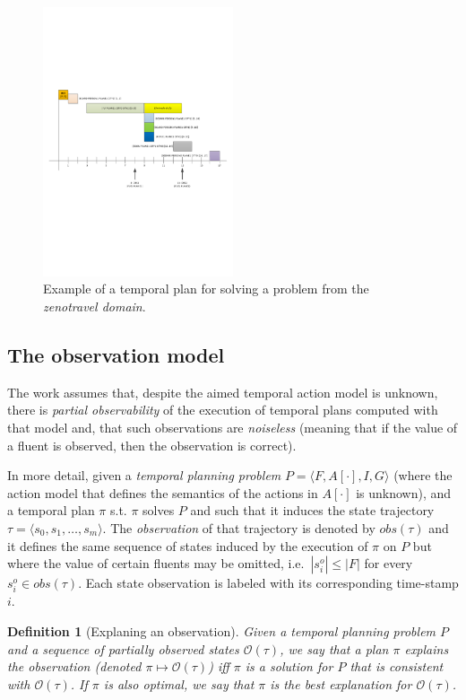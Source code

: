 \documentclass[letterpaper]{article} %
\newcommand{\tup}[1]{{\langle #1 \rangle}}
\newtheorem{definition}[theorem]{Definition}
\begin{document}
\begin{figure}
        \includegraphics[width=0.5\textwidth]{plan}
	\caption{Example of a temporal plan for solving a problem from the {\em zenotravel domain}.}
	\label{fig:plan}
\end{figure}


\subsection{The observation model}
The work assumes that, despite the aimed temporal action model is unknown, there is {\em partial observability} of the execution of temporal plans computed with that model and, that such observations are {\em noiseless} (meaning that if the value of a fluent is observed, then the observation is correct).

In more detail, given a {\em temporal planning problem} $P=\tup{F,A[\cdot],I,G}$ (where the action model that defines the semantics of the actions in $A[\cdot]$ is unknown), and a temporal plan $\pi$ s.t. $\pi$ solves $P$ and such that it induces the state trajectory $\tau=\tup{s_0, s_1, \ldots, s_m}$. The {\em observation} of that trajectory is denoted by $obs(\tau)$ and it defines the same sequence of states induced by the execution of $\pi$ on $P$ but where the value of certain fluents may be omitted, i.e.~$|s^o_i|\leq |F|$ for every $s^o_i\in obs(\tau)$. Each state observation is labeled with its corresponding time-stamp $i$.

\begin{definition}[Explaning an observation]
Given a {\em temporal planning problem} $P$ and a sequence of partially observed states $\mathcal{O}(\tau)$, we say that a plan $\pi$ {\em explains the observation} (denoted $\pi\mapsto\mathcal{O}(\tau)$) iff $\pi$ is a solution for $P$ that is {\em  consistent} with $\mathcal{O}(\tau)$. If $\pi$ is also optimal, we say that $\pi$ is the {\em best explanation} for $\mathcal{O}(\tau)$.
\end{definition}
\end{document}
